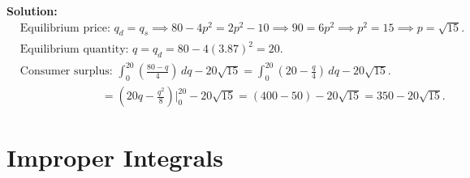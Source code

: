 \documentclass{article}
\begin{document}
\begin{enumerate}[leftmargin=0.5cm, label=\arabic*., rightmargin=0.2cm]
    \textbf{Solution:}
    \begin{align*}
        &\text{Equilibrium price: } q_d = q_s \implies 80 - 4p^2 = 2p^2 - 10
        \implies 90 = 6p^2 \implies p^2 = 15 \implies p = \sqrt{15}. \\
        & \text{Equilibrium quantity: } q = q_d = 80 - 4(3.87)^2 = 20. \\
        & \text{Consumer surplus: } \int_0^{20} \left(\frac{80 - q}{4}\right) \, dq - 20\sqrt{15}
        = \int_0^{20} \left(20 - \frac{q}{4}\right) \, dq - 20\sqrt{15}. \\
        &\hspace{3cm} = \left(20q - \frac{q^2}{8}\right)\Big|_0^{20} - 20\sqrt{15} = (400 - 50) - 20\sqrt{15} = 350 - 20\sqrt{15}.
    \end{align*}

\end{enumerate}

\section*{Improper Integrals}
\end{document}
